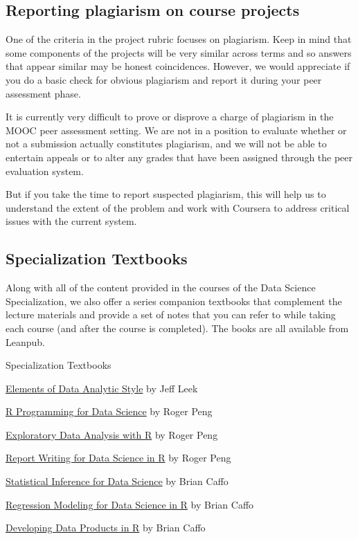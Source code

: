 \subsection*{Reporting plagiarism on course projects}

One of the criteria in the project rubric focuses on plagiarism. Keep in mind that some components of the projects will be very similar across terms and so answers that appear similar may be honest coincidences. However, we would appreciate if you do a basic check for obvious plagiarism and report it during your peer assessment phase.

It is currently very difficult to prove or disprove a charge of plagiarism in the MOOC peer assessment setting. We are not in a position to evaluate whether or not a submission actually constitutes plagiarism, and we will not be able to entertain appeals or to alter any grades that have been assigned through the peer evaluation system.

But if you take the time to report suspected plagiarism, this will help us to understand the extent of the problem and work with Coursera to address critical issues with the current system.


\subsection{Specialization Textbooks}

Along with all of the content provided in the courses of the Data Science Specialization, we also offer a series companion textbooks that complement the lecture materials and provide a set of notes that you can refer to while taking each course (and after the course is completed). The books are all available from Leanpub.

Specialization Textbooks
\begin{nitemize}
\item    \href{https://leanpub.com/datastyle}{Elements of Data Analytic Style} by Jeff Leek
\item    \href{https://leanpub.com/rprogramming?utm_source=DST2&utm_medium=Reading&utm_campaign=DST2}{R Programming for Data Science} by Roger Peng
\item    \href{https://leanpub.com/exdata?utm_source=DST2&utm_medium=Reading&utm_campaign=DST2}{Exploratory Data Analysis with R} by Roger Peng
\item    \href{https://leanpub.com/reportwriting?utm_source=DST2&utm_medium=Reading&utm_campaign=DST2}{Report Writing for Data Science in R} by Roger Peng
\item    \href{https://leanpub.com/LittleInferenceBook}{Statistical Inference for Data Science} by Brian Caffo
\item    \href{https://leanpub.com/regmods}{Regression Modeling for Data Science in R} by Brian Caffo
\item    \href{https://leanpub.com/ddp}{Developing Data Products in R} by Brian Caffo
\end{nitemize}

